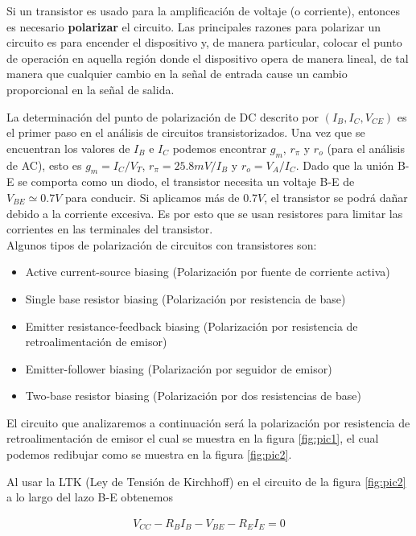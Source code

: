 \documentclass[12pt,a4paper]{article}
\begin{document}
	Si un transistor es usado para la amplificación de voltaje (o corriente), entonces es necesario \textbf{polarizar} el circuito. Las principales razones para polarizar un circuito es para encender el dispositivo y, de manera particular, colocar el punto de operación en aquella región donde el dispositivo opera de manera lineal, de tal manera que cualquier cambio en la señal de entrada cause un cambio proporcional en la señal de salida.
	
	La determinación del punto de polarización de DC descrito por $(I_B, I_C, V_{CE})$ es el primer paso en el análisis de circuitos transistorizados. Una vez que se encuentran los valores de $I_B$ e $I_C$ podemos encontrar $g_m$, $r_{\pi}$ y $r_o$ (para el análisis de AC), esto es $g_m = I_C/V_T$, $r_{\pi} = 25.8mV/I_B$ y $r_o = V_A/I_C$.
	Dado que la unión B-E se comporta como un diodo, el transistor necesita un voltaje B-E de $V_{BE} \simeq 0.7V$ para conducir. Si aplicamos más de $0.7V$, el transistor se podrá dañar debido a la corriente excesiva. Es por esto que se usan resistores para limitar las corrientes en las terminales del transistor.\\
	
	\noindent Algunos tipos de polarización de circuitos con transistores son:
	\begin{itemize}
		\item Active current-source biasing (Polarización por fuente de corriente activa)
		\item Single base resistor biasing (Polarización por resistencia de base)
		\item Emitter resistance-feedback biasing (Polarización por resistencia de retroalimentación de emisor)
		\item Emitter-follower biasing (Polarización por seguidor de emisor)
		\item Two-base resistor biasing (Polarización por dos resistencias de base) 
	\end{itemize}
	
	El circuito que analizaremos a continuación será la polarización por resistencia de retroalimentación de emisor el cual se muestra en la figura \ref{fig:pic1}, el cual podemos redibujar como se muestra en la figura \ref{fig:pic2}.
	
	Al usar la LTK (Ley de Tensión de Kirchhoff) en el circuito de la figura \ref{fig:pic2} a lo largo del lazo B-E obtenemos
	
	\begin{align}
		V_{CC} - R_BI_B - V_{BE} - R_EI_E = 0
	\end{align}
\end{document}

